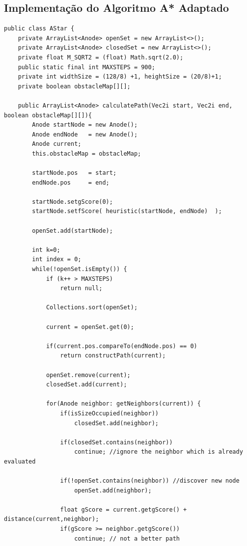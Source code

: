 \documentclass[12pt, 
openright, 
oneside, 
a4paper,    
brazil]{facom-ufu-abntex2}
\begin{document}
\begin{apendicesenv}


\chapter{Implementação do Algoritmo A* Adaptado}
\label{apend:alg:a*}
\begin{lstlisting}[caption=A* adaptado]
public class AStar {
	private ArrayList<Anode> openSet = new ArrayList<>();
	private ArrayList<Anode> closedSet = new ArrayList<>();
	private float M_SQRT2 = (float) Math.sqrt(2.0);
	public static final int MAXSTEPS = 900;
	private int widthSize = (128/8) +1, heightSize = (20/8)+1;
	private boolean obstacleMap[][];
	
	public ArrayList<Anode> calculatePath(Vec2i start, Vec2i end, boolean obstacleMap[][]){
		Anode startNode = new Anode();
		Anode endNode	= new Anode();
		Anode current;
		this.obstacleMap = obstacleMap;
		
		startNode.pos 	= start;
		endNode.pos 	= end;
		
		startNode.setgScore(0);
		startNode.setfScore( heuristic(startNode, endNode)  );
		
		openSet.add(startNode);
		
		int k=0;
		int index = 0;
		while(!openSet.isEmpty()) {
			if (k++ > MAXSTEPS) 
				return null;
			
			Collections.sort(openSet);
			
			current = openSet.get(0);
			
			if(current.pos.compareTo(endNode.pos) == 0) 
				return constructPath(current);
			
			openSet.remove(current);
			closedSet.add(current);
			
			for(Anode neighbor: getNeighbors(current)) {
				if(isSizeOccupied(neighbor))
					closedSet.add(neighbor);
				
				if(closedSet.contains(neighbor))
					continue; //ignore the neighbor which is already evaluated
				
				if(!openSet.contains(neighbor)) //discover new node
					openSet.add(neighbor);
						
				float gScore = current.getgScore() + distance(current,neighbor);
				if(gScore >= neighbor.getgScore())
					continue; // not a better path
				

\end{lstlisting}
\end{apendicesenv}
\end{document}
